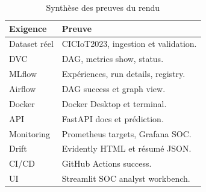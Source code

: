 \begin{table}[H]
\centering
\caption{Synthèse des preuves du rendu}
\label{tab:proofs}
\begin{tabularx}{\linewidth}{@{}lY@{}}
\toprule
\textbf{Exigence} & \textbf{Preuve}\\
\midrule
Dataset réel & CICIoT2023, ingestion et validation.\\
DVC & DAG, metrics show, status.\\
MLflow & Expériences, run details, registry.\\
Airflow & DAG success et graph view.\\
Docker & Docker Desktop et terminal.\\
API & FastAPI docs et prédiction.\\
Monitoring & Prometheus targets, Grafana SOC.\\
Drift & Evidently HTML et résumé JSON.\\
CI/CD & GitHub Actions success.\\
UI & Streamlit SOC analyst workbench.\\
\bottomrule
\end{tabularx}
\end{table}

